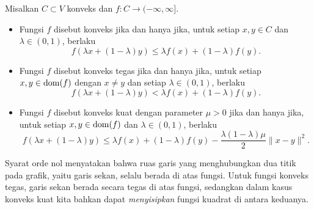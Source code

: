 \begin{defn}
    Misalkan $C\subset V$ konveks dan $f:C\rightarrow(-\infty,\infty]$.
    \begin{itemize}
        \item Fungsi $f$ disebut konveks jika dan hanya jika, untuk setiap $x,y\in C$ dan $\lambda\in(0,1)$, berlaku
        \begin{equation}
            f(\lambda x+(1-\lambda)y)\leq\lambda f(x)+(1-\lambda)f(y).
        \end{equation}
        \item Fungsi $f$ disebut konveks tegas jika dan hanya jika, untuk setiap
        $x,y\in\operatorname{\mathrm{dom}}(f)$ dengan $x\neq y$ dan setiap $\lambda\in(0,1)$, berlaku
        \begin{equation}
            f(\lambda x+(1-\lambda)y)<\lambda f(x)+(1-\lambda)f(y).
        \end{equation}
        \item Fungsi $f$ disebut konveks kuat dengan parameter $\mu>0$ jika dan
        hanya jika, untuk setiap $x,y\in\operatorname{\mathrm{dom}}(f)$ dan $\lambda\in(0,1)$, berlaku
        \begin{equation}
            f(\lambda x+(1-\lambda)y)\leq\lambda f(x)+(1-\lambda)f(y)-\frac{\lambda(1-\lambda)\mu}{2}\|x-y\|^2.
        \end{equation}
    \end{itemize}
\end{defn}
Syarat orde nol menyatakan bahwa ruas garis yang menghubungkan dua titik pada grafik, yaitu garis sekan, selalu berada di atas fungsi. Untuk fungsi konveks tegas, garis sekan berada secara tegas di atas fungsi, sedangkan dalam kasus konveks kuat kita bahkan dapat \emph{menyisipkan} fungsi kuadrat di antara keduanya.

